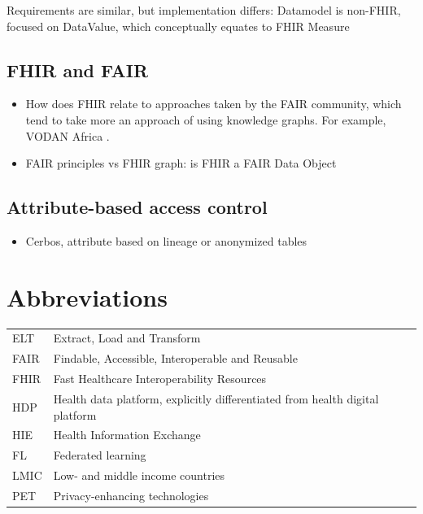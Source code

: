 \documentclass[
  authoryear]{elsarticle}
\providecommand{\tightlist}{%
  \setlength{\itemsep}{0pt}\setlength{\parskip}{0pt}}\usepackage{longtable,booktabs,array}
\begin{document}
Requirements are similar, but implementation differs: Datamodel is
non-FHIR, focused on DataValue, which conceptually equates to FHIR
Measure

\subsection{FHIR and FAIR}\label{fhir-and-fair}

\begin{itemize}
\tightlist
\item
  How does FHIR relate to approaches taken by the FAIR community, which
  tend to take more an approach of using knowledge graphs. For example,
  VODAN Africa \citep{gebreslassie2023fhir4fair, purnamajati2022data}.
\item
  FAIR principles vs FHIR graph: is FHIR a FAIR Data Object
\end{itemize}

\subsection{Attribute-based access
control}\label{attribute-based-access-control}

\begin{itemize}
\tightlist
\item
  Cerbos, attribute based on lineage or anonymized tables
\end{itemize}

\section{Abbreviations}\label{abbreviations}

\begin{longtable}[]{@{}
  >{\raggedright\arraybackslash}p{}
  >{\raggedright\arraybackslash}p{}@{}}
\toprule\noalign{}
\endhead
\bottomrule\noalign{}
\endlastfoot
ELT & Extract, Load and Transform \\
FAIR & Findable, Accessible, Interoperable and Reusable \\
FHIR & Fast Healthcare Interoperability Resources \\
HDP & Health data platform, explicitly differentiated from health
digital platform \\
HIE & Health Information Exchange \\
FL & Federated learning \\
LMIC & Low- and middle income countries \\
PET & Privacy-enhancing technologies \\
\end{longtable}


  
\end{document}
